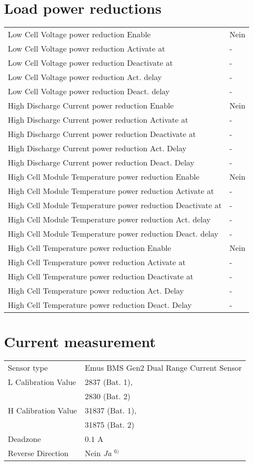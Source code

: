 \section*{Load power reductions}
\begin{tabular}{p{11cm}p{2cm}}
	Low Cell Voltage power reduction Enable & Nein \\
	Low Cell Voltage power reduction Activate at & - \\
	Low Cell Voltage power reduction Deactivate at & - \\
	Low Cell Voltage power reduction Act. delay & - \\
	Low Cell Voltage power reduction Deact. delay & - \\
	High Discharge Current power reduction Enable & Nein \\
	High Discharge Current power reduction Activate at & - \\
	High Discharge Current power reduction Deactivate at & - \\
	High Discharge Current power reduction Act. Delay & - \\
	High Discharge Current power reduction Deact. Delay & - \\
	High Cell Module Temperature power reduction Enable & Nein \\
	High Cell Module Temperature power reduction Activate at & - \\
	High Cell Module Temperature power reduction Deactivate at & - \\
	High Cell Module Temperature power reduction Act. delay & - \\
	High Cell Module Temperature power reduction Deact. delay & - \\
	High Cell Temperature power reduction Enable & Nein \\
	High Cell Temperature power reduction Activate at & - \\
	High Cell Temperature power reduction Deactivate at & - \\
	High Cell Temperature power reduction Act. Delay & - \\
	High Cell Temperature power reduction Deact. Delay & - \\
\end{tabular}

\section*{Current measurement}
\begin{tabular}{p{11cm}p{4cm}}
	Sensor type & Emus BMS Gen2 Dual Range Current Sensor \\
	L Calibration Value & 2837 (Bat. 1), \\ & 2830 (Bat. 2) \\
	H Calibration Value & 31837 (Bat. 1), \\ & 31875 (Bat. 2) \\
	Deadzone & $0.1$ A \\
	Reverse Direction & Nein \textit{Ja} $^{6)}$
\end{tabular}

